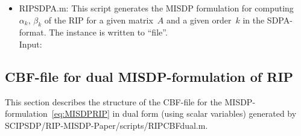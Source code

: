 \documentclass[11pt,a4paper]{article}
\newenvironment{dense_itemize}{%
  \begin{list}{$\circ$}%
    {\setlength{\topsep}{1mm}%
      \setlength{\partopsep}{0mm}%
      \setlength{\parskip}{0mm}%
      \setlength{\parsep}{0mm}%
      \setlength{\itemsep}{0mm}%
      \setlength{\labelwidth}{4mm}%
      \setlength{\leftmargin}{0mm}%
      \addtolength{\leftmargin}{\labelwidth}%
      \addtolength{\leftmargin}{\labelsep}%
      \setlength{\itemindent}{0mm}}}%
  {\end{list}}
\theoremstyle{definition}
\begin{document}
\begin{itemize}
\item \textsf{RIPSDPA.m}: This script generates the MISDP formulation
  for computing~$\alpha_k,\, \beta_k$ of the RIP for a given matrix~$A$ and
  a given order~$k$ in the SDPA-format. The instance is written to
  ``file''. \\
  Input:
\end{itemize}


\subsection{CBF-file for dual MISDP-formulation of RIP}
\label{sec:CBFdual}
This section describes the structure of the CBF-file for the
MISDP-formulation~\eqref{eq:MISDPRIP} in dual form (using scalar variables)
generated by
\textsf{SCIPSDP/RIP-MISDP-Paper/scripts/RIPCBFdual.m}.\\
\end{document}
